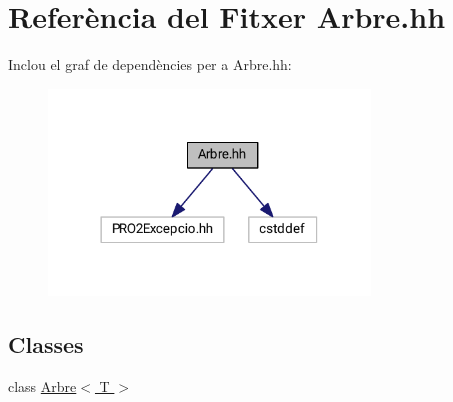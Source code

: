 \hypertarget{_arbre_8hh}{}\section{Referència del Fitxer Arbre.\+hh}
\label{_arbre_8hh}
Inclou el graf de dependències per a Arbre.\+hh\+:
\nopagebreak
\begin{figure}[H]
\begin{center}
\leavevmode
\includegraphics[width=242pt]{_arbre_8hh__incl}
\end{center}
\end{figure}
\subsection*{Classes}
\begin{DoxyCompactItemize}
\item 
class \hyperlink{class_arbre}{Arbre$<$ T $>$}
\end{DoxyCompactItemize}
